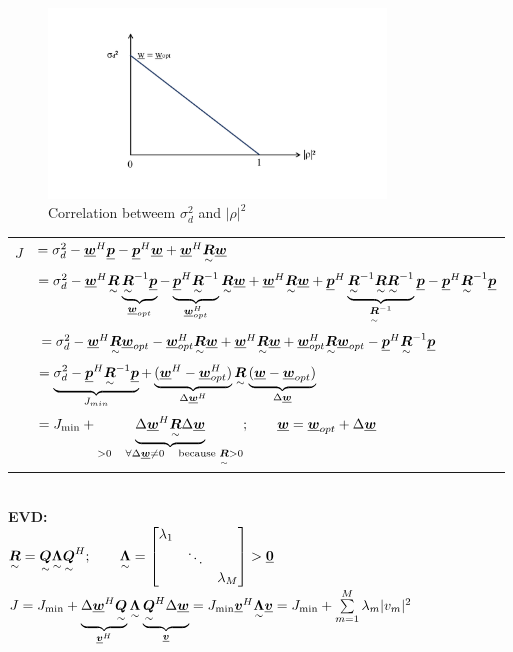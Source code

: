 \begin{figure}[htbp]
	\centering
		\includegraphics[trim =1cm 2cm 4cm 2cm, clip, width=0.80\textwidth]{graphics/diagram_rho_vs_sigma.pdf}
	\caption{Correlation betweem $\sigma_d^2$ and $|\rho|^2$}
	\label{fig:diagram_rho_vs_sigma}
\end{figure}

\begin{doublespace}
\begin{tabular}{ll}
$J$&$=\sigma_d^2 - \vec{w}^H\vec{p} - \vec{p}^H \vec{w} + \vec{w}^H \ma{R}\vec{w}$\\
&$=\sigma_d^2 - \vec{w}^H\ma{R}\underbrace{\ma{R}^{-1}\vec{p}}_{\vec{w}_{opt}} - \underbrace{\vec{p}^H \ma{R}^{-1}}
_{\vec{w}^H_{opt}} \ma{R} \vec{w} + \vec{w}^H \ma{R}\vec{w} + \vec{p}^H \underbrace{\ma{R}^{-1}\ma{R}\ma{R}^{-1}}_{\ma{R}^{-1}}\vec{p} - \vec{p}^H\ma{R}^{-1}\vec{p}$\\
&$=\sigma_d^2 - \vec{w}^H\ma{R}\vec{w}_{opt} - \vec{w}^H_{opt}\ma{R}\vec{w} + \vec{w}^H\ma{R}\vec{w} + \vec{w}^H_{opt}\ma{R}\vec{w}_{opt} - \vec{p}^H\ma{R}^{-1}\vec{p}$\\
&$=\underbrace{\sigma_d^2 - \vec{p}^H\ma{R}^{-1}\vec{p}}_{J_{min}} + \underbrace{(\vec{w}^H-\vec{w}^H_{opt})}_{\Delta\vec{w}^H}\ma{R} \underbrace{(\vec{w} - \vec{w}_{opt})}_{\Delta\vec{w}}$\\
&$=J_{\text{min}} + \underbrace{\Delta\vec{w}^H\ma{R}\Delta\vec{w}}_{>0 \quad \forall \Delta\vec{w}\neq 0 \quad \text{because } \ma{R}>0}; \qquad \vec{w}=\vec{w}_{opt} + \Delta\vec{w}$
\end{tabular}\\
\textbf{EVD:}\\
$\ma{R} = \ma{Q} \ma{\Lambda} \ma{Q}^H; \qquad \ma{\Lambda} = \mat{\lambda_1 & & \\ & \ddots &\\ & & \lambda_M} > \vec{0}$\\
$J=J_{\text{min}} + \underbrace{\Delta\vec{w}^H \ma{Q}}_{\vec{v}^H} \ma{\Lambda} \underbrace{\ma{Q}^H \Delta\vec{w}}_{\vec{v}} = J_{\text{min}} \vec{v}^H \ma{\Lambda} \vec{v} = J_{\text{min}} + \sum\limits_{m=1}^{M} \lambda_m |v_m|^2$\\
\end{doublespace}

